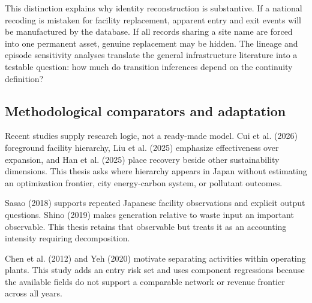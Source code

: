 \documentclass[12pt,letterpaper]{article}
\begin{document}
This distinction explains why identity reconstruction is substantive. If a
national recoding is mistaken for facility replacement, apparent entry and exit
events will be manufactured by the database. If all records sharing a site name
are forced into one permanent asset, genuine replacement may be hidden. The
lineage and episode sensitivity analyses translate the general infrastructure
literature into a testable question: how much do transition inferences depend on
the continuity definition?

\subsection{Methodological comparators and adaptation}

Recent studies supply research logic, not a ready-made model. Cui et al.
(2026) foreground facility hierarchy, Liu et al. (2025) emphasize effectiveness
over expansion, and Han et al. (2025) place recovery beside other sustainability
dimensions. This thesis asks where hierarchy appears in Japan without estimating
an optimization frontier, city energy-carbon system, or pollutant outcomes.

Sasao (2018) supports repeated Japanese facility observations and explicit
output questions. Shino (2019) makes generation relative to waste input an
important observable. This thesis retains that observable but treats it as an
accounting intensity requiring decomposition.

Chen et al. (2012) and Yeh (2020) motivate separating activities within
operating plants. This study adds an entry risk set and uses component
regressions because the available fields do not support a comparable network or
revenue frontier across all years.
\end{document}
